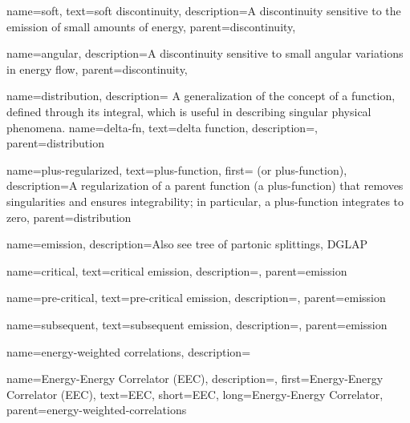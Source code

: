     {
        name=soft,
        text=soft discontinuity,
        description={A discontinuity sensitive to the emission of small amounts of energy},
        parent=discontinuity,
    }

    {
        name=angular,
        description={A discontinuity sensitive to small angular variations in energy flow},
        parent=discontinuity,
    }

{
    name=distribution,
    description={
        A generalization of the concept of a function, defined through its integral, which is useful in describing singular physical phenomena.
    }
}
    {
      name=delta-fn,
      text=delta function,
      description={},
      parent=distribution
    }

    {
      name=plus-regularized,
      text=plus-function,
      first= (or plus-function),
      description={A regularization of a parent function (a plus-function) that removes singularities and ensures integrability;
      in particular, a plus-function integrates to zero},
      parent=distribution
    }



{
    name=emission,
    description={Also see tree of partonic splittings, DGLAP}
}

    {
        name=critical,
        text=critical emission,
        description={},
        parent=emission
    }

    {
        name=pre-critical,
        text=pre-critical emission,
        description={},
        parent=emission
    }

    {
        name=subsequent,
        text=subsequent emission,
        description={},
        parent=emission
    }



{
    name=energy-weighted correlations,
    description={}
}


    {
        name=Energy-Energy Correlator (EEC),
        description={},
        first={Energy-Energy Correlator (EEC)},
        text={EEC},
        short={EEC},
        long={Energy-Energy Correlator},
        parent=energy-weighted-correlations
    }


